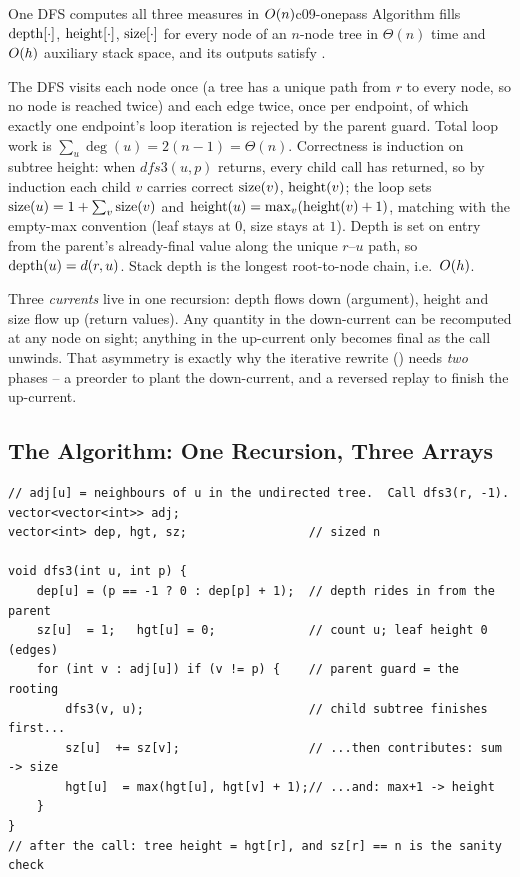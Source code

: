 \begin{theorem}{One DFS computes all three measures in $O(n)$}{c09-onepass}
Algorithm  fills $\operatorname{depth}[\cdot]$, $\operatorname{height}[\cdot]$, $\operatorname{size}[\cdot]$ for
every node of an $n$-node tree in $\Theta(n)$ time and $O(h)$ auxiliary stack space,
and its outputs satisfy .
\end{theorem}
\begin{proofbox}
The DFS visits each node once (a tree has a unique path from $r$ to every node, so no
node is reached twice) and each edge twice, once per endpoint, of which exactly one
endpoint's loop iteration is rejected by the parent guard. Total loop work is
$\sum_u \deg(u) = 2(n-1) = \Theta(n)$. Correctness is induction on subtree height: when
$\mathit{dfs3}(u,p)$ returns, every child call has returned, so by induction each child
$v$ carries correct $\operatorname{size}(v)$, $\operatorname{height}(v)$; the loop sets
$\operatorname{size}(u)=1+\sum_v\operatorname{size}(v)$ and $\operatorname{height}(u)=\max_v(\operatorname{height}(v)+1)$, matching
 with the empty-max convention (leaf stays at $0$,
size stays at $1$). Depth is set on entry from the parent's already-final value along the
unique $r$--$u$ path, so $\operatorname{depth}(u)=d(r,u)$. Stack depth is the longest root-to-node
chain, i.e.\ $O(h)$.
\end{proofbox}

\begin{insightbox}
Three \emph{currents} live in one recursion: depth flows down (argument), height and size
flow up (return values). Any quantity in the down-current can be recomputed at any node
on sight; anything in the up-current only becomes final as the call unwinds. That
asymmetry is exactly why the iterative rewrite () needs \emph{two}
phases -- a preorder to plant the down-current, and a reversed replay to finish the
up-current.
\end{insightbox}

\subsection{The Algorithm: One Recursion, Three Arrays}

\begin{lstlisting}[caption={The general-tree measures DFS: depth pushed down, height and size folded up}, label={lst:c09-dfs3}]
// adj[u] = neighbours of u in the undirected tree.  Call dfs3(r, -1).
vector<vector<int>> adj;
vector<int> dep, hgt, sz;                 // sized n

void dfs3(int u, int p) {
    dep[u] = (p == -1 ? 0 : dep[p] + 1);  // depth rides in from the parent
    sz[u]  = 1;   hgt[u] = 0;             // count u; leaf height 0 (edges)
    for (int v : adj[u]) if (v != p) {    // parent guard = the rooting
        dfs3(v, u);                       // child subtree finishes first...
        sz[u]  += sz[v];                  // ...then contributes: sum  -> size
        hgt[u]  = max(hgt[u], hgt[v] + 1);// ...and: max+1 -> height
    }
}
// after the call: tree height = hgt[r], and sz[r] == n is the sanity check
\end{lstlisting}

